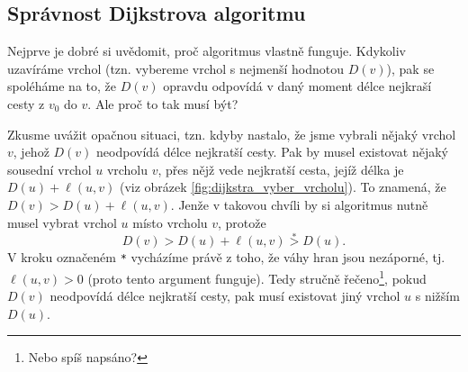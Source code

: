 \subsection{Správnost Dijkstrova algoritmu}

Nejprve je dobré si uvědomit, proč algoritmus vlastně funguje. Kdykoliv uzavíráme vrchol (tzn. vybereme vrchol s nejmenší hodnotou $D(v)$), pak se spoléháme na to, že $D(v)$ opravdu odpovídá v daný moment délce nejkraší cesty z $v_0$ do $v$. Ale proč to tak musí být?

Zkusme uvážit opačnou situaci, tzn. kdyby nastalo, že jsme vybrali nějaký vrchol $v$, jehož $D(v)$ neodpovídá délce nejkratší cesty. Pak by musel existovat nějaký sousední vrchol $u$ vrcholu $v$, přes nějž vede nejkratší cesta, jejíž délka je $D(u)+\ell(u,v)$ (viz obrázek \ref{fig:dijkstra_vyber_vrcholu}). To znamená, že $D(v)>D(u)+\ell(u,v)$. Jenže v takovou chvíli by si algoritmus nutně musel vybrat vrchol $u$ místo vrcholu $v$, protože
\[D(v)>D(u)+\ell(u,v)\stackrel{\texttt{*}}{>}D(u).\]
V kroku označeném \texttt{*} vycházíme právě z toho, že váhy hran jsou nezáporné, tj. $\ell(u,v)>0$ (proto tento argument funguje). Tedy stručně řečeno\footnote{Nebo spíš napsáno?}, pokud $D(v)$ neodpovídá délce nejkratší cesty, pak musí existovat jiný vrchol $u$ s nižším $D(u)$.
